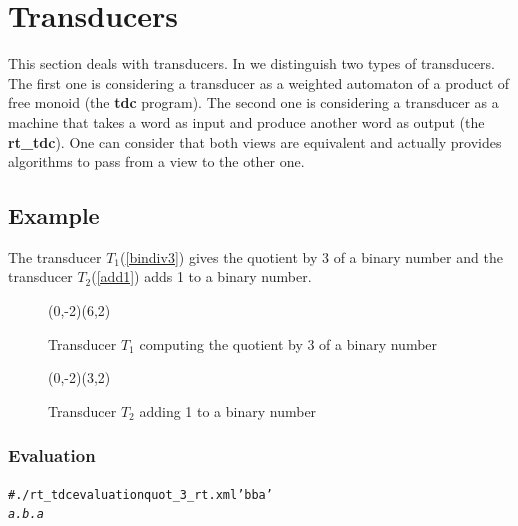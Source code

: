 \section{Transducers}

This section deals with transducers. In \Vauc we distinguish two types
of transducers. The first one is considering a transducer as a
weighted automaton of a product of free monoid (the \textbf{tdc}
program). The second one is considering a transducer as a machine that
takes a word as input and produce another word as output (the
\textbf{rt\_tdc}). One can consider that both views are equivalent and
\Vauc actually provides algorithms to pass from a view to the other one.

\subsection{Example}

The transducer $T_1$(\autoref{bindiv3}) gives the quotient by 3 of a
binary number and the transducer $T_2$(\autoref{add1}) adds 1 to a binary number.

\begin{figure}[h]
  \begin{center}
    \begin{VCPicture}{(0,-2)(6,2)}
  
\end{VCPicture}
\caption{Transducer $T_1$ computing the quotient by 3 of a binary number}
\label{bindiv3}
  \end{center}
\end{figure}
\begin{figure}[h]
  \begin{center}
    \begin{VCPicture}{(0,-2)(3,2)}
 
\end{VCPicture}
\caption{Transducer $T_2$ adding 1 to a binary number}
\label{add1}
  \end{center}
\end{figure}

\subsubsection{Evaluation}
\begin{alltt}
# ./rt_tdc evaluation quot_3_rt.xml 'bba'
\textit{a.b.a}
\end{alltt}

